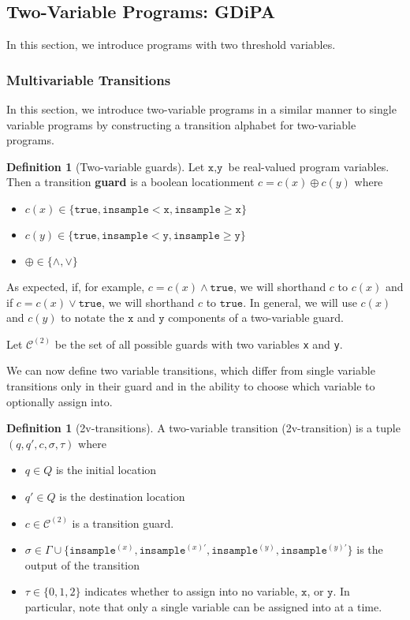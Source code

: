 \documentclass[12pt]{article}
\newcommand{\gguard}[1][x]{\texttt{insample}\geq#1}
\newcommand{\lguard}[1][x]{\texttt{insample} < #1}
\theoremstyle{definition}
\newtheorem{defn}[thm]{Definition}
\begin{document}
\subsection{Two-Variable Programs: GDiPA}

In this section, we introduce programs with two threshold variables.  

\subsubsection{Multivariable Transitions}

In this section, we introduce two-variable programs in a similar manner to single variable programs by constructing a transition alphabet for two-variable programs.

\begin{defn}[Two-variable guards]
    Let $\texttt{x}, \texttt{y}$ be real-valued program variables. Then a transition \textbf{guard} is a boolean locationment $c = c(x)\oplus c(y)$ where \begin{itemize}
        \item $c(x)\in \{\texttt{true}, \lguard[\texttt{x}], \gguard[\texttt{x}]\}$
        \item $c(y)\in \{\texttt{true}, \lguard[\texttt{y}], \gguard[\texttt{y}]\}$
        \item $\oplus \in \{\land, \lor\}$
    \end{itemize}
    As expected, if, for example, $c = c(x) \land \texttt{true}$, we will shorthand $c$ to $c(x)$ and if $c = c(x)\lor \texttt{true}$, we will shorthand $c$ to $\texttt{true}$. In general, we will use $c(x)$ and $c(y)$ to notate the $\texttt{x}$ and $\texttt{y}$ components of a two-variable guard. 

    Let $\mathcal{C}^{(2)}$ be the set of all possible guards with two variables \texttt{x} and \texttt{y}.
\end{defn}

We can now define two variable transitions, which differ from single variable transitions only in their guard and in the ability to choose which variable to optionally assign into. 

\begin{defn}[2v-transitions]
    A two-variable transition (2v-transition) is a tuple $(q, q', c, \sigma, \tau)$ where \begin{itemize}
        \item $q\in Q$ is the initial location
        \item $q'\in Q$ is the destination location
        \item $c\in\mathcal{C}^{(2)}$ is a transition guard.
        \item $\sigma\in\Gamma\cup\{\texttt{insample}^{(x)}, \texttt{insample}^{(x)\prime}, \texttt{insample}^{(y)}, \texttt{insample}^{(y)\prime}\}$ is the output of the transition
        \item $\tau \in \{0, 1, 2\}$ indicates whether to assign into no variable, $\texttt{x}$, or $\texttt{y}$. In particular, note that only a single variable can be assigned into at a time. 
    \end{itemize}
\end{defn}
\end{document}

